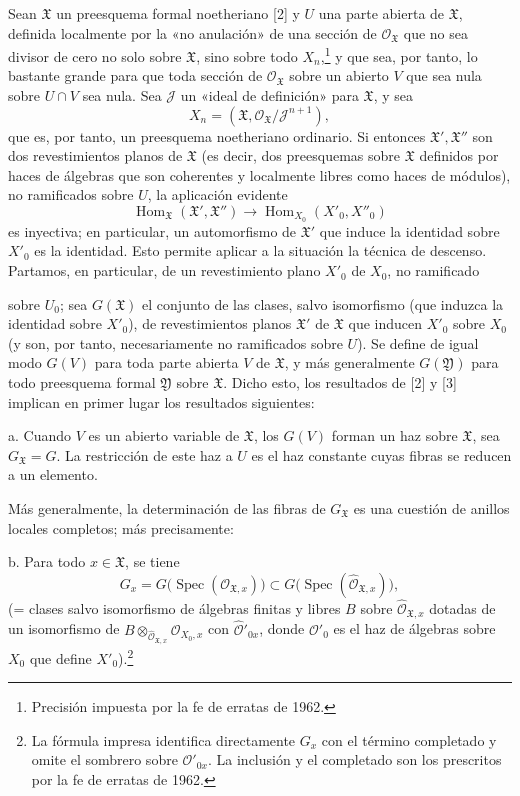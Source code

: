 Sean $\mathfrak X$ un preesquema formal noetheriano [2] y $U$ una parte
abierta de $\mathfrak X$, definida localmente por la «no anulación» de una
sección de $\mathcal O_{\mathfrak X}$ que no sea divisor de cero no solo sobre
$\mathfrak X$, sino sobre todo $X_n$,\footnote{Precisión impuesta por la fe de
erratas de 1962.} y que sea, por tanto, lo bastante grande para que toda sección
de $\mathcal O_{\mathfrak X}$ sobre un abierto $V$ que sea nula sobre $U\cap V$
sea nula. Sea $\mathcal J$ un «ideal de definición» para $\mathfrak X$, y sea
\[
  X_n=(\mathfrak X,\mathcal O_{\mathfrak X}/\mathcal J^{n+1}),
\]
que es, por tanto, un preesquema noetheriano ordinario. Si entonces
$\mathfrak X',\mathfrak X''$ son dos revestimientos planos de $\mathfrak X$ (es
decir, dos preesquemas sobre $\mathfrak X$ definidos por haces de álgebras que
son coherentes y localmente libres como haces de módulos), no ramificados sobre
$U$, la aplicación evidente
\[
  \operatorname{Hom}_{\mathfrak X}(\mathfrak X',\mathfrak X'')
  \longrightarrow
  \operatorname{Hom}_{X_0}(X'_0,X''_0)
\]
es inyectiva; en particular, un automorfismo de $\mathfrak X'$ que induce la
identidad sobre $X'_0$ es la identidad. Esto permite aplicar a la situación la
técnica de descenso. Partamos, en particular, de un revestimiento plano $X'_0$
de $X_0$, no ramificado

sobre $U_0$; sea $G(\mathfrak X)$ el conjunto de las clases, salvo isomorfismo
(que induzca la identidad sobre $X'_0$), de revestimientos planos $\mathfrak X'$
de $\mathfrak X$ que inducen $X'_0$ sobre $X_0$ (y son, por tanto,
necesariamente no ramificados sobre $U$). Se define de igual modo $G(V)$ para
toda parte abierta $V$ de $\mathfrak X$, y más generalmente $G(\mathfrak Y)$
para todo preesquema formal $\mathfrak Y$ sobre $\mathfrak X$. Dicho esto, los
resultados de [2] y [3] implican en primer lugar los resultados siguientes:

\noindent a. Cuando $V$ es un abierto variable de $\mathfrak X$, los $G(V)$
forman un haz sobre $\mathfrak X$, sea $G_{\mathfrak X}=G$. La restricción de
este haz a $U$ es el haz constante cuyas fibras se reducen a un elemento.

Más generalmente, la determinación de las fibras de $G_{\mathfrak X}$ es una
cuestión de anillos locales completos; más precisamente:

\noindent b. Para todo $x\in\mathfrak X$, se tiene
\[
  G_x=G\bigl(\operatorname{Spec}(\mathcal O_{\mathfrak X,x})\bigr)
  \subset
  G\bigl(\operatorname{Spec}(\widehat{\mathcal O}_{\mathfrak X,x})\bigr),
\]
(= clases salvo isomorfismo de álgebras finitas y libres $B$ sobre
$\widehat{\mathcal O}_{\mathfrak X,x}$ dotadas de un isomorfismo de
$B\otimes_{\widehat{\mathcal O}_{\mathfrak X,x}}\mathcal O_{X_0,x}$ con
$\widehat{\mathcal O}'_{0x}$, donde $\mathcal O'_0$ es el haz de álgebras sobre
$X_0$ que define $X'_0$).\footnote{La fórmula impresa identifica directamente
$G_x$ con el término completado y omite el sombrero sobre
$\mathcal O'_{0x}$. La inclusión y el completado son los prescritos por la fe
de erratas de 1962.}

